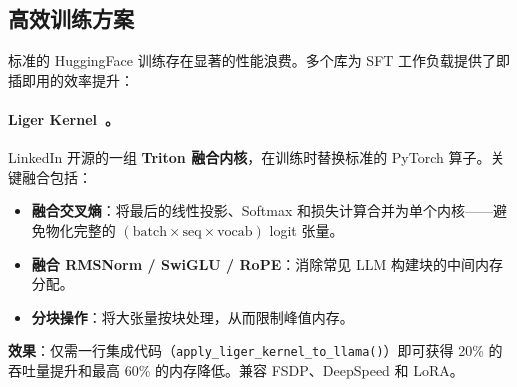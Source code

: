 \subsection{高效训练方案}
\label{efficient-training-solutions}

标准的 HuggingFace 训练存在显著的性能浪费。多个库为 SFT 工作负载提供了即插即用的效率提升：

\paragraph{Liger Kernel~\cite{hsu2024liger}。}
\label{liger-kernel-.}

LinkedIn 开源的一组 \textbf{Triton 融合内核}，在训练时替换标准的 PyTorch 算子。关键融合包括：

\begin{itemize}
  \item \textbf{融合交叉熵}：将最后的线性投影、Softmax 和损失计算合并为单个内核——避免物化完整的 $(\text{batch} \times \text{seq} \times \text{vocab})$ logit 张量。
  \item \textbf{融合 RMSNorm / SwiGLU / RoPE}：消除常见 LLM 构建块的中间内存分配。
  \item \textbf{分块操作}：将大张量按块处理，从而限制峰值内存。
\end{itemize}

\textbf{效果}：仅需一行集成代码（\texttt{apply\_liger\_kernel\_to\_llama()}）即可获得 20\% 的吞吐量提升和最高 60\% 的内存降低。兼容 FSDP、DeepSpeed 和 LoRA。

